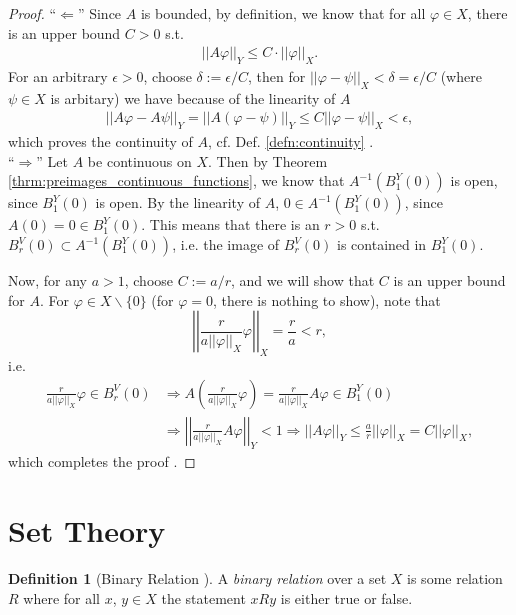 \documentclass[12pt, a4paper]{article}
\numberwithin{equation}{section}
\theoremstyle{definition}
\theoremstyle{definition}
\newtheorem{defn}[thm]{Definition} %
\newcommand{\norm}[2]{\left\vert\left\vert #1 \right\vert\right\vert_{#2}}
\begin{document}
	\begin{proof}
		\enquote{$\Longleftarrow$} Since $A$ is bounded, by definition, we know that for all $\varphi\in X$, there is an upper bound $C > 0$ s.t. 
		\begin{align}
			\norm{A\varphi}{Y} \leq C\cdot \norm{\varphi}{X}.
		\end{align}
		For an arbitrary $\epsilon > 0$, choose $\delta := \epsilon/C$, then for $\norm{\varphi - \psi}{X} < \delta = \epsilon/C$ (where $\psi\in X$ is arbitary) we have because of the linearity of $A$
		\begin{align}
			\norm{A\varphi - A\psi}{Y} = \norm{A(\varphi - \psi)}{Y} \leq C\norm{\varphi - \psi}{X} < \epsilon,
		\end{align}
		which proves the continuity of $A$, cf. Def. \ref{defn:continuity} \cite{556667}.
		\\
		
		\enquote{$\Longrightarrow$} Let $A$ be continuous on $X$. Then by Theorem \ref{thrm:preimages_continuous_functions}, we know that $A^{-1}\left(B^{Y}_1(0)\right)$ is open, since $B^{Y}_{1}(0)$ is open. By the linearity of $A$, $0\in A^{-1}\left(B^{Y}_1(0)\right)$, since \\ $A(0) = 0 \in B_1^{Y}(0)$. This means that there is an $r > 0$ s.t. $B^{V}_{r}(0) \subset A^{-1}\left(B^{Y}_1(0)\right)$, i.e. the image of $B^{V}_{r}(0)$ is contained in $B^{Y}_{1}(0)$.
		
		Now, for any $a > 1$, choose $C := a/r$, and we will show that $C$ is an upper bound for $A$. For $\varphi\in X\backslash \{0\}$ (for $\varphi =0$, there is nothing to show), note that $$\norm{\frac{r}{a\norm{\varphi}{X}}\varphi}{X} = \frac{r}{a} < r,$$ i.e. 
		\begin{align}
			\frac{r}{a\norm{\varphi}{X}}\varphi \in B_{r}^{V}(0) &\Rightarrow A\left(\frac{r}{a\norm{\varphi}{X}}\varphi\right) = \frac{r}{a\norm{\varphi}{X}}A\varphi\in B^{Y}_{1}(0) 
			\\[6pt] &\Rightarrow \norm{\frac{r}{a\norm{\varphi}{X}}A\varphi}{Y} < 1 \Rightarrow \norm{A\varphi}{Y} \leq \frac{a}{r}\norm{\varphi}{X} = C\norm{\varphi}{X},
		\end{align}
		which completes the proof \cite[p. 2]{src:mit_lec}.
	\end{proof}
	
	\newpage 
	\section{Set Theory}
	\begin{defn}[Binary Relation \cite{binary_relations}]
		A \textit{binary relation} over a set $X$ is some relation $R$ where for all $x$, $y\in X$ the statement $xRy$ is either true or false. 
	\end{defn}
	
\end{document}
